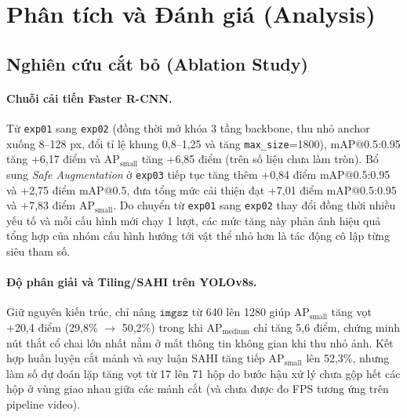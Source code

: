 \documentclass[11pt]{article}
\begin{document}

\section{Phân tích và Đánh giá (Analysis)}

\subsection{Nghiên cứu cắt bỏ (Ablation Study)}

\paragraph{Chuỗi cải tiến Faster R-CNN.}
Từ \texttt{exp01} sang \texttt{exp02} (đồng thời mở khóa 3 tầng backbone, thu nhỏ anchor xuống 8--128 px, đổi tỉ lệ khung 0,8--1,25 và tăng \texttt{max\_size}=1800), mAP@0.5:0.95 tăng +6,17 điểm và $\text{AP}_{\text{small}}$ tăng +6,85 điểm (trên số liệu chưa làm tròn). Bổ sung \textit{Safe Augmentation} ở \texttt{exp03} tiếp tục tăng thêm +0,84 điểm mAP@0.5:0.95 và +2,75 điểm mAP@0.5, đưa tổng mức cải thiện đạt +7,01 điểm mAP@0.5:0.95 và +7,83 điểm $\text{AP}_{\text{small}}$. Do chuyển từ \texttt{exp01} sang \texttt{exp02} thay đổi đồng thời nhiều yếu tố và mỗi cấu hình mới chạy 1 lượt, các mức tăng này phản ánh hiệu quả tổng hợp của nhóm cấu hình hướng tới vật thể nhỏ hơn là tác động cô lập từng siêu tham số.

\paragraph{Độ phân giải và Tiling/SAHI trên YOLOv8s.}
Giữ nguyên kiến trúc, chỉ nâng $\texttt{imgsz}$ từ 640 lên 1280 giúp $\text{AP}_{\text{small}}$ tăng vọt +20,4 điểm (29,8\% $\to$ 50,2\%) trong khi $\text{AP}_{\text{medium}}$ chỉ tăng 5,6 điểm, chứng minh nút thắt cổ chai lớn nhất nằm ở mất thông tin không gian khi thu nhỏ ảnh. Kết hợp huấn luyện cắt mảnh và suy luận SAHI tăng tiếp $\text{AP}_{\text{small}}$ lên 52,3\%, nhưng làm số dự đoán lặp tăng vọt từ 17 lên 71 hộp do bước hậu xử lý chưa gộp hết các hộp ở vùng giao nhau giữa các mảnh cắt (và chưa được đo FPS tương ứng trên pipeline video).
\end{document}
